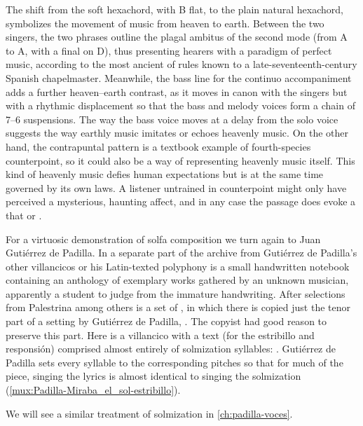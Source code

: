 The shift from the  soft hexachord, with B flat, to the plain
natural hexachord, symbolizes the movement of music from heaven to earth.
Between the two singers, the two phrases outline the plagal ambitus of the
second mode (from A to A, with a final on D), thus presenting hearers with a
paradigm of perfect music, according to the most ancient of rules known to a
late-seventeenth-century Spanish chapelmaster.
Meanwhile, the bass line for the continuo accompaniment adds a further
heaven--earth contrast, as it moves in canon with the singers but with a
rhythmic displacement so that the bass and melody voices form a chain of 7--6
suspensions.
The way the bass voice moves at a delay from the solo voice suggests the way
earthly music imitates or echoes heavenly music.
On the other hand, the contrapuntal pattern is a textbook example of
fourth-species counterpoint, so it could also be a way of representing heavenly
music itself.  
This kind of heavenly music defies human expectations but is at the same time
governed by its own laws.
A listener untrained in counterpoint might only have perceived a mysterious,
haunting affect, and in any case the passage does evoke a  that  or .

For a virtuosic demonstration of solfa composition we turn again to Juan
Gutiérrez de Padilla.
In a separate part of the archive from Gutiérrez de Padilla's other villancicos
or his Latin-texted polyphony is a small handwritten notebook containing an
anthology of exemplary works gathered by an unknown musician, apparently a
student to judge from the immature handwriting.
After selections from Palestrina among others is a set of , in which there is copied just the tenor part of a setting
by Gutiérrez de Padilla, .%
The copyist had good reason to preserve this part.
Here is a villancico with a text (for the estribillo and responsión) comprised
almost entirely of solmization syllables:  .
Gutiérrez de Padilla sets every syllable to the corresponding pitches so that
for much of the piece, singing the lyrics is almost identical to singing the
solmization (\cref{mux:Padilla-Miraba_el_sol-estribillo}).%
\begin{Footnote}
    We will see a similar treatment of solmization in \cref{ch:padilla-voces}.
\end{Footnote}

